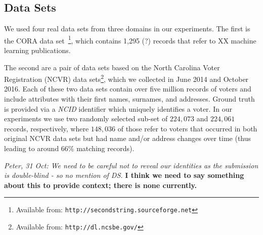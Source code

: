\documentclass{llncs}
\begin{document}

\subsection{Data Sets}
\label{sec-data}

We used four real data sets from three domains in our experiments. The
first is the CORA data set~\footnote{Available from:
\texttt{http://secondstring.sourceforge.net}}, which contains 1,295
(?) records that refer to XX machine learning publications.

The second are a pair of data sets based on the North Carolina Voter
Registration (NCVR) data sets\footnote{Available from: \texttt{http://dl.ncsbe.gov/}}, which we collected in June 2014 and
October 2016. Each of these two data sets contain over five million
records of voters and include attributes with their first names,
surnames, and addresses. Ground truth is provided via a \emph{NCID}
identifier which uniquely identifies a voter. In our experiments we
use two randomly selected sub-set of $224,073$ and $224,061$ records,
respectively, where $148,036$ of those refer to voters that occurred
in both original NCVR data sets but had name and/or address changes
over time (thus leading to around $66\%$ matching records).

\emph{Peter, 31 Oct: We need to be careful not to reveal our identities
as the submission is double-blind - so no mention of DS.}
\textbf{I think we need to say something about this to provide context; there is none currently.}

\end{document}
